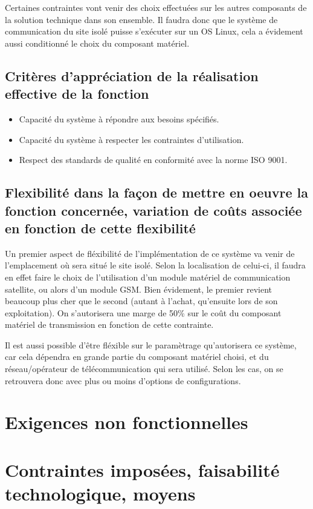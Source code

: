 Certaines contraintes vont venir des choix effectuées sur les autres composants de la solution technique dans son ensemble. Il faudra donc que le système de communication du site isolé puisse s'exécuter sur un OS Linux, cela a évidement aussi conditionné le choix du composant matériel.

\subsection{Critères d'appréciation de la réalisation effective de la fonction}

\begin{itemize}
\item Capacité du système à répondre aux besoins spécifiés.
\item Capacité du système à respecter les contraintes d'utilisation.
\item Respect des standards de qualité en conformité avec la norme ISO 9001.
\end{itemize}

\subsection{Flexibilité dans la façon de mettre en oeuvre la fonction concernée, variation de coûts associée en fonction de cette flexibilité}

Un premier aspect de fléxibilité de l'implémentation de ce système va venir de l'emplacement où sera situé le site isolé. Selon la localisation de celui-ci, il faudra en effet faire le choix de l'utilisation d'un module matériel de communication satellite, ou alors d'un module GSM. Bien évidement, le premier revient beaucoup plus cher que le second (autant à l'achat, qu'ensuite lors de son exploitation). On s'autorisera une marge de 50\% sur le coût du composant matériel de transmission en fonction de cette contrainte.

Il est aussi possible d'être fléxible sur le paramètrage qu'autorisera ce système, car cela dépendra en grande partie du composant matériel choisi, et du réseau/opérateur de télécommunication qui sera utilisé. Selon les cas, on se retrouvera donc avec plus ou moins d'options de configurations.

\section{Exigences non fonctionnelles}

\section{Contraintes imposées, faisabilité technologique, moyens}

